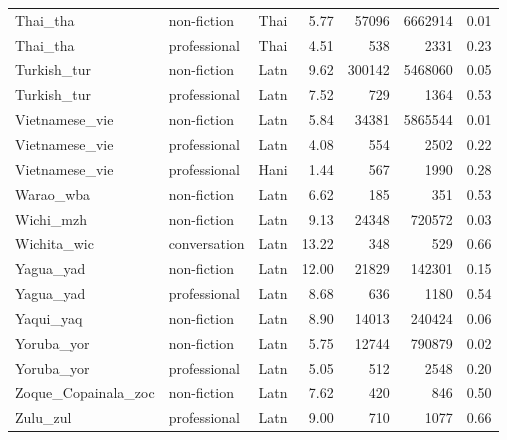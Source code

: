 \begin{longtable}{lllrrrr}
  Thai\_tha & non-fiction & Thai & 5.77 & 57096 & 6662914 & 0.01 \\ 
  Thai\_tha & professional & Thai & 4.51 & 538 & 2331 & 0.23 \\ 
  Turkish\_tur & non-fiction & Latn & 9.62 & 300142 & 5468060 & 0.05 \\ 
  Turkish\_tur & professional & Latn & 7.52 & 729 & 1364 & 0.53 \\ 
  Vietnamese\_vie & non-fiction & Latn & 5.84 & 34381 & 5865544 & 0.01 \\ 
  Vietnamese\_vie & professional & Latn & 4.08 & 554 & 2502 & 0.22 \\ 
  Vietnamese\_vie & professional & Hani & 1.44 & 567 & 1990 & 0.28 \\ 
  Warao\_wba & non-fiction & Latn & 6.62 & 185 & 351 & 0.53 \\ 
  Wichi\_mzh & non-fiction & Latn & 9.13 & 24348 & 720572 & 0.03 \\ 
  Wichita\_wic & conversation & Latn & 13.22 & 348 & 529 & 0.66 \\ 
  Yagua\_yad & non-fiction & Latn & 12.00 & 21829 & 142301 & 0.15 \\ 
  Yagua\_yad & professional & Latn & 8.68 & 636 & 1180 & 0.54 \\ 
  Yaqui\_yaq & non-fiction & Latn & 8.90 & 14013 & 240424 & 0.06 \\ 
  Yoruba\_yor & non-fiction & Latn & 5.75 & 12744 & 790879 & 0.02 \\ 
  Yoruba\_yor & professional & Latn & 5.05 & 512 & 2548 & 0.20 \\ 
  Zoque\_Copainala\_zoc & non-fiction & Latn & 7.62 & 420 & 846 & 0.50 \\ 
  Zulu\_zul & professional & Latn & 9.00 & 710 & 1077 & 0.66 \\ 
  \hline
\end{longtable}
